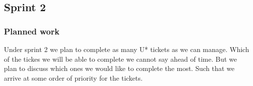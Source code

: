 \subsection{Sprint 2}

\subsubsection{Planned work}
Under sprint 2 we plan to complete as many U* tickets as we can manage. Which of the tickes we will be able to complete we cannot say ahead of time. But we plan to discuss which ones we would like to complete the most. Such that we arrive at some order of priority for the tickets.


